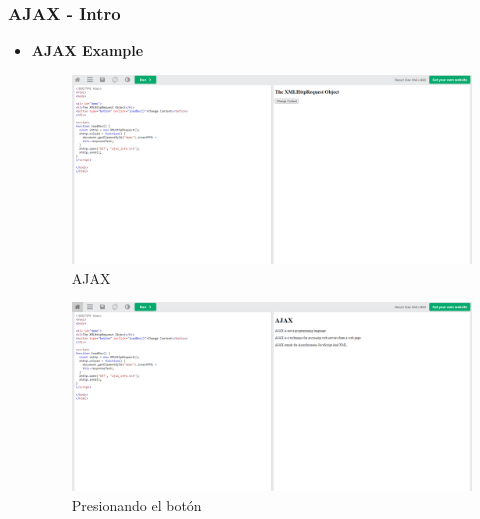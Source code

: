 \documentclass{article}
\begin{document}
	\subsubsection{AJAX - Intro}
	\begin{itemize}
		\item \textbf{AJAX Example}
		\begin{figure}[H]
			\centering
			\includegraphics[width=1\textwidth,keepaspectratio]{img/ejemplo0.png}
			\caption{AJAX}
		\end{figure}
		\newpage
		\begin{figure}[H]
			\centering
			\includegraphics[width=1\textwidth,keepaspectratio]{img/boton0.png}
			\caption{Presionando el botón}
		\end{figure}
	\end{itemize}
\end{document}
